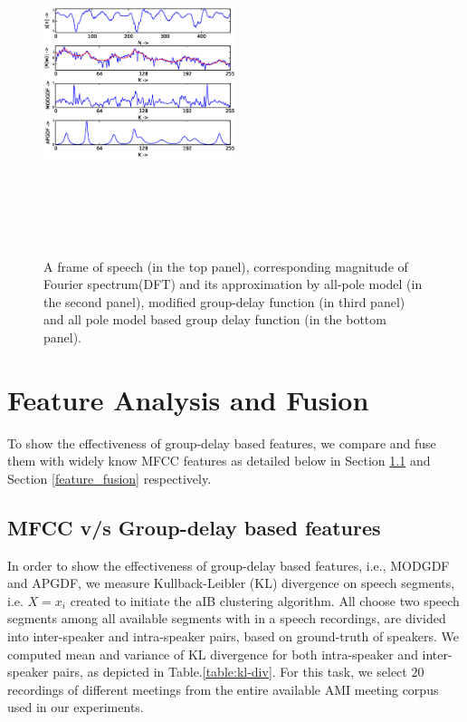 \documentclass[conference]{IEEEtran}
\begin{document}
\begin{figure}[h]
\centering
\includegraphics[width=0.5\textwidth,height=10cm]{figures/apSpectrum.eps}
\caption{ A frame of speech (in the top panel), corresponding magnitude of Fourier spectrum(DFT) and its approximation by all-pole model (in the second panel), modified group-delay function (in third panel) and all pole model based group delay function (in the bottom panel).}
\label{fig:all-pole}
\end{figure}



\section{Feature Analysis and Fusion}
\label{feature_analysis_and_fusion}

To show the effectiveness of group-delay based features, we compare and fuse them with widely know MFCC features as detailed below in Section \ref{feature_analysis} and Section \ref{feature_fusion} respectively.

\subsection{MFCC v/s Group-delay based features}
\label{feature_analysis}
In order to show the effectiveness of group-delay based features, i.e., MODGDF and APGDF, we measure Kullback-Leibler (KL) divergence on speech segments, i.e. $X={x_i}$ created to initiate the aIB clustering algorithm. All choose two speech segments among all available segments with in a speech recordings, are divided into inter-speaker and intra-speaker pairs, based on ground-truth of speakers. We computed mean and variance of KL divergence for both intra-speaker and inter-speaker pairs, as depicted in Table.\ref{table:kl-div}. For this task, we select $20$ recordings of different meetings from the entire available AMI meeting corpus used in our experiments. 
\end{document}
